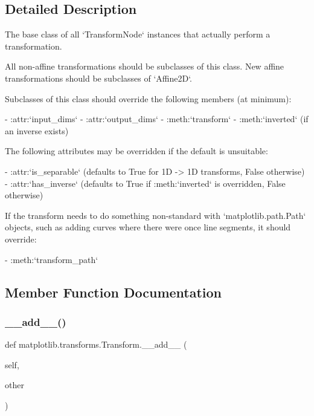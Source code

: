 \subsection{Detailed Description}
\begin{DoxyVerb}The base class of all `TransformNode` instances that
actually perform a transformation.

All non-affine transformations should be subclasses of this class.
New affine transformations should be subclasses of `Affine2D`.

Subclasses of this class should override the following members (at
minimum):

- :attr:`input_dims`
- :attr:`output_dims`
- :meth:`transform`
- :meth:`inverted` (if an inverse exists)

The following attributes may be overridden if the default is unsuitable:

- :attr:`is_separable` (defaults to True for 1D -> 1D transforms, False
  otherwise)
- :attr:`has_inverse` (defaults to True if :meth:`inverted` is overridden,
  False otherwise)

If the transform needs to do something non-standard with
`matplotlib.path.Path` objects, such as adding curves
where there were once line segments, it should override:

- :meth:`transform_path`
\end{DoxyVerb}
 

\subsection{Member Function Documentation}
\mbox{\label{classmatplotlib_1_1transforms_1_1Transform_a31fb50cbd6cef81aa01a2d9977528da6}} 
\subsubsection{\texorpdfstring{\+\_\+\+\_\+add\+\_\+\+\_\+()}{\_\_add\_\_()}}
{\footnotesize\ttfamily def matplotlib.\+transforms.\+Transform.\+\_\+\+\_\+add\+\_\+\+\_\+ (\begin{DoxyParamCaption}\item[{}]{self,  }\item[{}]{other }\end{DoxyParamCaption})}

